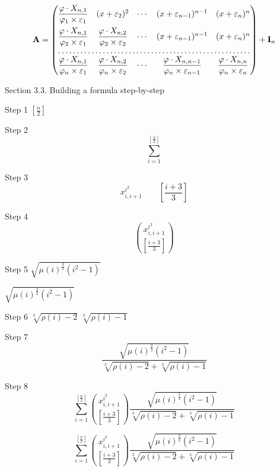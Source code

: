 \documentclass{article}
\begin{document}
\[
   \mathbf{A} = 
   \begin{pmatrix}
     \quot{1}{1} & \exn{2} & \cdots & \exn{n - 1}&\exn{n}\\[10pt]
     \quot{1}{2} & \quot{2}{2} & \cdots & \exn{n - 1} &\exn{n}\\
     \hdotsfor{5}\\
     \quot{1}{n} & \quot{2}{n} & \cdots & 
     \quot{n - 1}{n} & \quot{n}{n}
   \end{pmatrix} 
   + \mathbf{I}_{n}
\]

Section 3.3. Building a formula step-by-step

Step 1
$\left[ \frac{n}{2} \right]$

Step 2
\[ 
   \sum_{i = 1}^{ \left[ \frac{n}{2} \right] } 
\]

Step 3
\[ 
   x_{i, i + 1}^{i^{2}} \qquad \left[ \frac{i + 3}{3} \right] 
\]

Step 4
\[
   \binom{ x_{i,i + 1}^{i^{2}} }{ \left[ \frac{i + 3}{3} \right] } 
\]

Step 5
$\sqrt{ \mu(i)^{ \frac{3}{2} } (i^{2} - 1) }$

$\sqrt{ \mu(i)^{ \frac{3}{2} } (i^{2} - 1) }$

Step 6
$\sqrt[3]{ \rho(i) - 2 }$  $\sqrt[3]{ \rho(i) - 1 }$

Step 7
\[
   \frac{ \sqrt{ \mu(i)^{ \frac{3}{2}} (i^{2} -1) } } 
        { \sqrt[3]{\rho(i) - 2} + \sqrt[3]{\rho(i) - 1} } 
\]

Step 8
\[
   \sum_{i = 1}^{ \left[ \frac{n}{2} \right] }
      \binom{ x_{i, i + 1}^{i^{2}} }
            { \left[ \frac{i + 3}{3} \right] }
      \frac{ \sqrt{ \mu(i)^{ \frac{3}{2}} (i^{2} - 1) } } 
           { \sqrt[3]{\rho(i) - 2} + \sqrt[3]{\rho(i) - 1} }
\]

\[\sum_{i=1}^{\left[\frac{n}{2}\right]}\binom{x_{i,i+1}^{i^{2}}}
{\left[\frac{i+3}{3}\right]}\frac{\sqrt{\mu(i)^{\frac{3}
{2}}(i^{2}-1)}}{\sqrt[3]{\rho(i)-2}+\sqrt[3]{\rho(i)-1}}\] 

\end{document}
